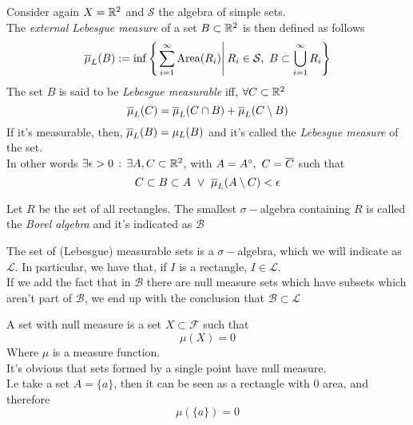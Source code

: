 \documentclass[../complete.tex]{subfiles}
\begin{document}
\begin{dfn}
	Consider again $X=\mathbb{R}^2$ and $\mathcal{S}$ the algebra of simple sets.\\
	The \textit{external Lebesgue measure} of a set $B\subset\mathbb{R}^2$ is then defined as follows
	\begin{equation}
		\cc{\mu}_L(B):=\inf\left\{ \derin{\sum_{i=1}^\infty\mathrm{Area}(R_i)} R_i\in\mathcal{S},\ B\subset\bigcup_{i=1}^\infty R_i \right\}
		\label{eq:upperlebmeas}
	\end{equation}
	The set $B$ is said to be \textit{Lebesgue measurable} iff, $\forall C\subset\mathbb{R}^2$
	\begin{equation}
		\overline{\mu}_L(C)=\overline{\mu}_L(C\cap B)+\overline{\mu}_L(C\setminus B)
		\label{eq:lebmeasset}
	\end{equation}
	If it's measurable, then, $\overline{\mu}_L(B)=\mu_L(B)$ and it's called the \textit{Lebesgue measure} of the set.\\
	In other words $\exists\epsilon>0\, :\, \exists A,C\subset\mathbb{R}^2$, with $A=\intr{A},\ C=\cc{C}$ such that
	\begin{equation}
		C\subset B\subset A\ \vee\ \overline{\mu}_L(A\setminus C)<\epsilon
		\label{eq:formlebmeas}
	\end{equation}
\end{dfn}
\begin{dfn}
	Let $R$ be the set of all rectangles. The smallest $\sigma-$algebra containing $R$ is called the \textit{Borel algebra} and it's indicated as $\mathcal{B}$
\end{dfn}
\begin{dfn}
	The set of (Lebesgue) measurable sets is a $\sigma-$algebra, which we will indicate as $\mathcal{L}$. In particular, we have that, if $I$ is a rectangle, $I\in\mathcal{L}$.\\
	If we add the fact that in $\mathcal{B}$ there are null measure sets which have subsets which aren't part of $\mathcal{B}$, we end up with the conclusion that $\mathcal{B}\subset\mathcal{L}$
\end{dfn}
\begin{dfn}
	A set with null measure is a set $X\subset\mathcal{F}$ such that
	\begin{equation}
		\mu(X)=0
		\label{eq:nullmeas}
	\end{equation}
	Where $\mu$ is a measure function.\\
	It's obvious that sets formed by a single point have null measure.\\
	I.e take a set $A=\{a\}$, then it can be seen as a rectangle with $0$ area, and therefore
	\begin{equation}
		\mu\left( \{a\} \right)=0
		\label{eq:singlepointmeas}
	\end{equation}
\end{dfn}
\end{document}
